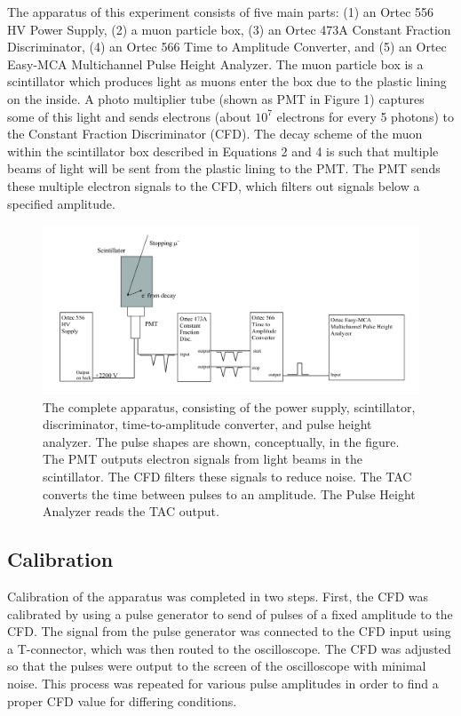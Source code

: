 \documentclass[%
 aip,
 amsmath,amssymb,
 reprint,%
floatfix,
]{revtex4-1}
\begin{document}
The apparatus of this experiment consists of five main parts: (1) an Ortec 556 HV Power Supply, (2) a muon particle box, (3) an Ortec 473A Constant Fraction Discriminator, (4) an Ortec 566 Time to Amplitude Converter, and (5) an Ortec Easy-MCA Multichannel Pulse Height Analyzer. The muon particle box is a scintillator which produces light as muons enter the box due to the plastic lining on the inside. A photo multiplier tube (shown as PMT in Figure 1) captures some of this light and sends electrons (about $10^7$ electrons for every 5 photons) to the Constant Fraction Discriminator (CFD). The decay scheme of the muon within the scintillator box described in Equations 2 and 4 is such that multiple beams of light will be sent from the plastic lining to the PMT. The PMT sends these multiple electron signals to the CFD, which filters out signals below a specified amplitude.

\begin{figure}[H]
	\centering
	\includegraphics[scale=0.25]{schematic.png}
	\caption{The complete apparatus, consisting of the power supply, scintillator, discriminator, time-to-amplitude converter, and pulse height analyzer. The pulse shapes are shown, conceptually, in the figure. The PMT outputs electron signals from light beams in the scintillator. The CFD filters these signals to reduce noise. The TAC converts the time between pulses to an amplitude. The Pulse Height Analyzer reads the TAC output.\cite{oxymanual}}
\end{figure}

\subsection{Calibration}

Calibration of the apparatus was completed in two steps. First, the CFD was calibrated by using a pulse generator to send of pulses of a fixed amplitude to the CFD. The signal from the pulse generator was connected to the CFD input using a T-connector, which was then routed to the oscilloscope. The CFD was adjusted so that the pulses were output to the screen of the oscilloscope with minimal noise. This process was repeated for various pulse amplitudes in order to find a proper CFD value for differing conditions.
\end{document}

